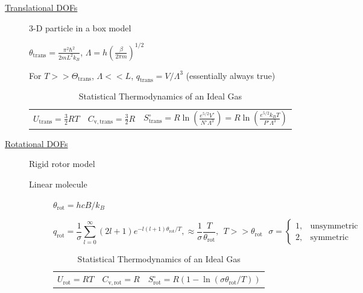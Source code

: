 \documentclass[11pt]{article}
\begin{document}
\begin{table}
\begin{center}
    \caption{\large{Statistical Thermodynamics of an Ideal Gas}}
   \begin{description}
    \item[\underline{Translational DOFs}] {3-D particle in a box model}

$\displaystyle \theta_\mathrm{trans}= \frac{\pi^2\hbar^2}{2 m
  L^2 k_B}$,
$\displaystyle \Lambda=h\left( \frac{\beta}{2\pi m}\right )^{1/2}$

For $ T >> \Theta_\mathrm{trans}$, $\Lambda << L$, $\displaystyle
q_\mathrm{trans}=V/\Lambda^3$ (essentially always true)

\begin{tabular}{ccc}
$\displaystyle U_\mathrm{trans}=\frac{3}{2}RT$ & $\displaystyle C_\mathrm{v,trans} =
\frac{3}{2}R $ & $\displaystyle S^\circ_\mathrm{trans}=R \ln \left (
  \frac{e^{5/2}V^\circ}{N^\circ \Lambda^3}\right ) = R \ln \left (
  \frac{e^{5/2}k_BT}{P^\circ \Lambda^3}\right ) $ \\
\end{tabular}

  \item[\underline{Rotational DOFs}] {Rigid rotor model}
\begin{description}
\item[Linear molecule]{}
$\theta_\mathrm{rot} =hcB/k_B$

\begin{equation*}
q_\mathrm{rot}=\frac{1}{\sigma}\sum_{l=0}^\infty (2l+1)e^{-l(l+1)\theta_\mathrm{rot}/T},
\approx \frac{1}{\sigma}\frac{T}{\theta_\mathrm{rot}},\ \ T>>\theta_\mathrm{rot}\ \ \ \sigma = \left \{
        \begin{array}{rl}
          1, & \text{unsymmetric} \\
          2, & \text{symmetric}
        \end{array} \right .
\end{equation*}
\begin{tabular}{ccc}
$\displaystyle U_\mathrm{rot}=RT$ & $\displaystyle C_\mathrm{v,rot} =
R $ & $\displaystyle S^\circ_\mathrm{rot}=R (1-\ln(\sigma\theta_\mathrm{rot}/T)) $ \\
\end{tabular}


\end{description}
\end{description}
\end{center}
\end{table}
\end{document}
